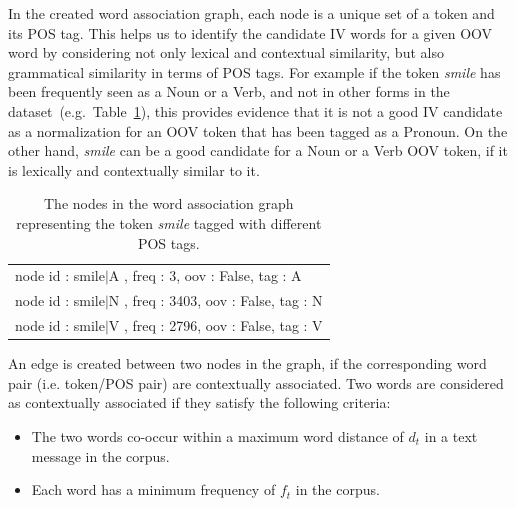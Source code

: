 \documentclass[preprint,review,12pt]{elsarticle}
\begin{document}


In the created word association graph, each node is a unique set of a token and its POS tag. This helps us to identify the candidate IV words for a given OOV word by considering not only lexical and contextual similarity, but also grammatical similarity in terms of POS tags. For example if the token \textit{smile} has been frequently seen as a Noun or a Verb, and not in other forms in the dataset~(e.g.~Table~\ref{tab:nodes}), this provides evidence that it is not a good IV candidate as a normalization for an OOV token that has  been tagged as a Pronoun. On the other hand, \textit{smile} can be a good candidate for a Noun or a Verb OOV token, if it is lexically and contextually similar to it.

\begin{table}[hbt]
  \centering
  \begin{tabular}[tc]{l}
    node id : smile$|$A , freq : 3, oov : False, tag : A \\
    node id : smile$|$N , freq : 3403, oov : False, tag : N \\
    node id : smile$|$V , freq : 2796, oov : False, tag : V \\
  \end{tabular}
  \caption{The nodes in the word association graph representing the token \textit{smile} tagged with different POS tags.}
\label{tab:nodes}
\end{table}

An edge is created between two nodes in the graph, if the corresponding word pair (i.e. token/POS pair) are contextually associated. Two words are considered as contextually associated if they satisfy the following criteria:

\begin{itemize}
\item The two words co-occur within a maximum word distance of $d_t$ in a text message in the corpus.
\item Each word has a minimum frequency of $f_t$ in the corpus.
\end{itemize}
\end{document}
